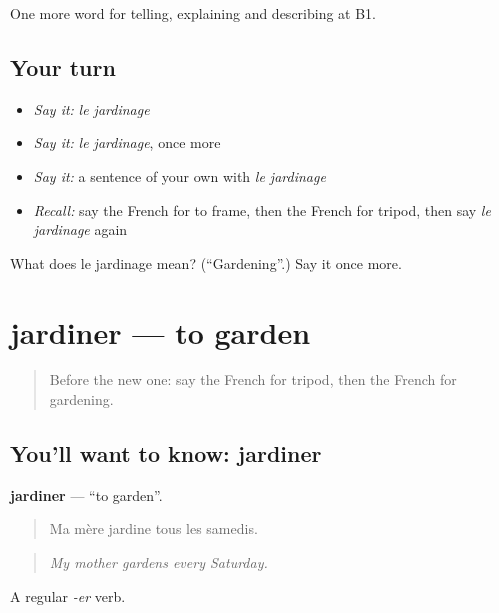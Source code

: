 \begin{grammarlens}[title={What you've built}]
One more word for telling, explaining and describing at B1.
\end{grammarlens}

\subsection*{Your turn}
\begin{itemize}
\raggedright
  \item \emph{Say it:} \emph{le jardinage}
  \item \emph{Say it:} \emph{le jardinage}, once more
  \item \emph{Say it:} a sentence of your own with \emph{le jardinage}
  \item \emph{Recall:} say the French for to frame, then the French for tripod, then say \emph{le jardinage} again
\end{itemize}

\begin{tcolorbox}[breakable,colback=teal!4,colframe=teal!35!black,title={Before you move on}]
What does le jardinage mean? (\textquotedblleft{}Gardening\textquotedblright{}.) Say it once more.
\end{tcolorbox}
\section[jardiner]{jardiner — to garden}

\label{lesson:FR-C503-jardiner}



\begin{quote}
Before the new one: say the French for tripod, then the French for gardening.
\end{quote}

\subsection*{You'll want to know: jardiner}
\textbf{jardiner} — \textquotedblleft{}to garden\textquotedblright{}.

\begin{quote}
Ma mère jardine tous les samedis.
\end{quote}

\begin{quote}
\emph{My mother gardens every Saturday.}
\end{quote}

A regular \emph{-er} verb.

